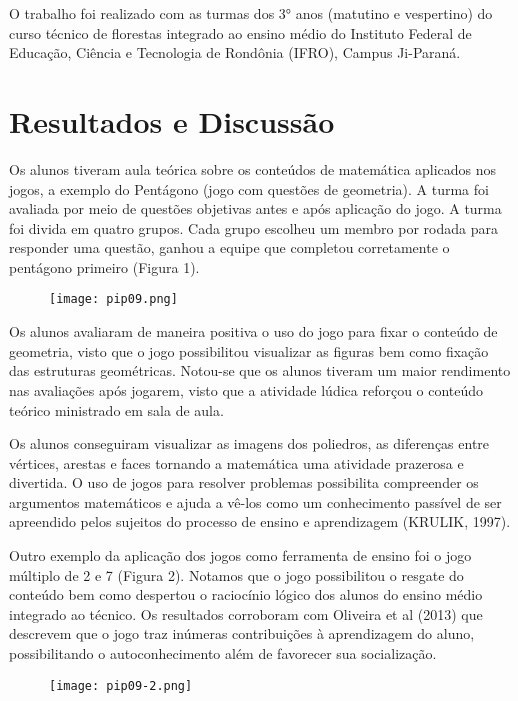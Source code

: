 \documentclass[article,12pt,onesidea,4paper,english,brazil]{abntex2}
\begin{document}
O trabalho foi realizado com as turmas dos 3° anos (matutino e vespertino) do curso técnico de florestas integrado ao ensino médio do Instituto Federal de Educação, Ciência e Tecnologia de Rondônia (IFRO), Campus Ji-Paraná.
	
	\section*{Resultados e Discussão}
	
Os alunos tiveram aula teórica sobre os conteúdos de matemática aplicados nos jogos, a exemplo do Pentágono (jogo com questões de geometria). A turma foi avaliada por meio de questões objetivas antes e após aplicação do jogo. A turma foi divida em quatro grupos. Cada grupo escolheu um membro por rodada para responder uma questão, ganhou a equipe que completou corretamente o pentágono primeiro (Figura 1).

\begin{figure}[h]
	\centering
	\texttt{[image: pip09.png]}
\end{figure}

Os alunos avaliaram de maneira positiva o uso do jogo para fixar o conteúdo de geometria, visto que o jogo possibilitou visualizar as figuras bem como fixação das estruturas geométricas. Notou-se que os alunos tiveram um maior rendimento nas avaliações após jogarem, visto que a atividade lúdica reforçou o conteúdo teórico ministrado em sala de aula.

Os alunos conseguiram visualizar as imagens dos poliedros, as diferenças entre vértices, arestas e faces tornando a matemática uma atividade prazerosa e divertida. O uso de jogos para resolver problemas possibilita compreender os argumentos matemáticos e ajuda a vê-los como um conhecimento passível de ser apreendido pelos sujeitos do processo de ensino e aprendizagem (KRULIK, 1997).

Outro exemplo da aplicação dos jogos como ferramenta de ensino foi o jogo múltiplo de 2 e 7 (Figura 2). Notamos que o jogo possibilitou o resgate do conteúdo bem como despertou o raciocínio lógico dos alunos do ensino médio integrado ao técnico. Os resultados corroboram com Oliveira et al (2013) que descrevem que o jogo traz inúmeras contribuições à aprendizagem do aluno, possibilitando o autoconhecimento além de favorecer sua socialização.

\begin{figure}[h]
	\centering
	\texttt{[image: pip09-2.png]}
\end{figure}
	
\end{document}
